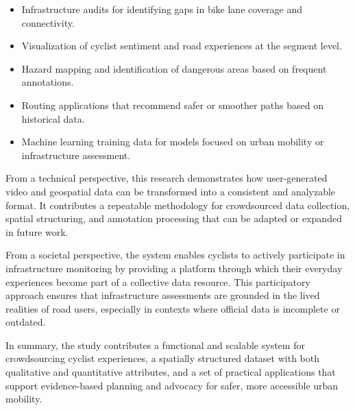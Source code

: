 \begin{itemize}
\item Infrastructure audits for identifying gaps in bike lane coverage and connectivity.
\item Visualization of cyclist sentiment and road experiences at the segment level.
\item Hazard mapping and identification of dangerous areas based on frequent annotations.
\item Routing applications that recommend safer or smoother paths based on historical data.
\item Machine learning training data for models focused on urban mobility or infrastructure assessment.
\end{itemize}

From a technical perspective, this research demonstrates how user-generated video and geospatial data can be transformed into a consistent and analyzable format. It contributes a repeatable methodology for crowdsourced data collection, spatial structuring, and annotation processing that can be adapted or expanded in future work.

From a societal perspective, the system enables cyclists to actively participate in infrastructure monitoring by providing a platform through which their everyday experiences become part of a collective data resource. This participatory approach ensures that infrastructure assessments are grounded in the lived realities of road users, especially in contexts where official data is incomplete or outdated.

In summary, the study contributes a functional and scalable system for crowdsourcing cyclist experiences, a spatially structured dataset with both qualitative and quantitative attributes, and a set of practical applications that support evidence-based planning and advocacy for safer, more accessible urban mobility.

